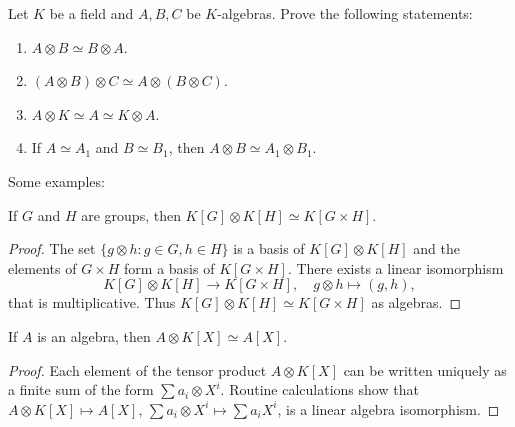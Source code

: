 
\begin{exercise}
    Let $K$ be a field and $A,B,C$ be $K$-algebras. 
    Prove the following statements:
	\begin{enumerate}
		\item $A\otimes B\simeq B\otimes A$.
		\item $(A\otimes B)\otimes C\simeq A\otimes(B\otimes C)$.
		\item $A\otimes K\simeq A\simeq K\otimes A$.
		\item If $A\simeq A_1$ and $B\simeq B_1$, then $A\otimes B\simeq A_1\otimes B_1$.
	\end{enumerate}
\end{exercise}

Some examples:

\begin{proposition}
	If $G$ and $H$ are groups, then $K[G]\otimes K[H]\simeq K[G\times H]$.
\end{proposition}

\begin{proof}
	The set $\{g\otimes h:g\in G,h\in H\}$ is a basis of $K[G]\otimes K[H]$ and 
	the elements of $G\times H$ form a basis of $K[G\times H]$. There exists a linear isomorphism 
	\[
	K[G]\otimes K[H]\to K[G\times H], 
	\quad 
	g\otimes h\mapsto (g,h),
	\]
	that is multiplicative. Thus $K[G]\otimes K[H]\simeq K[G\times H]$
	as algebras. 
\end{proof}

\begin{proposition}
\label{pro:AKX=AX}
	If $A$ is an algebra, then $A\otimes K[X]\simeq A[X]$.	
\end{proposition}

\begin{proof}
	Each element of the tensor product $A\otimes K[X]$ can be written uniquely as a finite sum of
	the form $\sum a_i\otimes X^i$. Routine calculations show that 
	$A\otimes K[X]\mapsto A[X]$, $\sum a_i\otimes X^i\mapsto \sum a_iX^i$, is a 
	linear algebra isomorphism. 
\end{proof}


